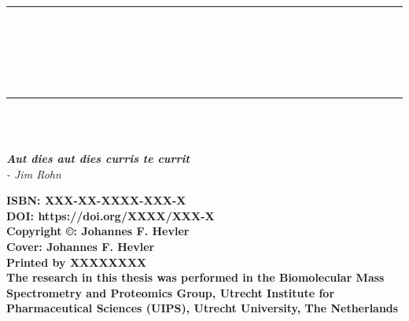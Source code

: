 
\pagestyle{empty} %
\frontmatter %

\begin{titlepage}
\begin{center}
\rule{\textwidth}{1.5pt}\\[0cm]
{\huge \bfseries \thesistitle \par \ }\\[-0.5cm]
\rule{\textwidth}{1.5pt}\\[2.5cm]
{\large \bfseries\name}\\
[2cm]
\begin{small}
    \emph{\textbf{Aut dies aut dies curris te currit} \\
    - Jim Rohn}
\end{small}    
\end{center}
\clearpage
\begin{flushleft}
    \vspace*{\fill}
    
    {\small \textbf{ISBN: XXX-XX-XXXX-XXX-X}\\
    \textbf{DOI: https://doi.org/XXXX/XXX-X}\\
    [0.5cm]
    \textbf{Copyright ©: Johannes F. Hevler}\\
    \textbf{Cover: Johannes F. Hevler}\\
    \textbf{Printed by XXXXXXXX}\\
    [0.5cm]
    \textbf{The research in this thesis was performed in the Biomolecular Mass
    Spectrometry and Proteomics Group, Utrecht Institute for Pharmaceutical Sciences (UIPS), Utrecht University, The Netherlands}}

\end{flushleft}    
\clearpage


\end{titlepage}
